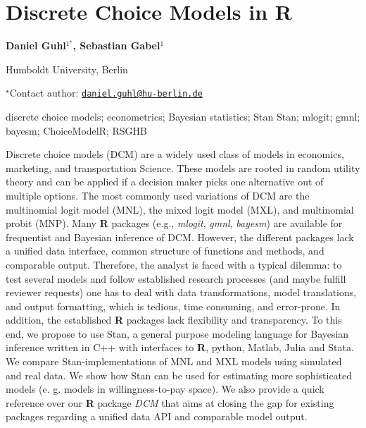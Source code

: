 \documentclass[\main/boa.tex]{subfiles}
\begin{document}
\section{Discrete Choice Models in R}

\begin{center}
  {\bf Daniel Guhl$^{1^\star}$, Sebastian Gabel$^{1}$}
\end{center}

\vskip 0.3cm

\begin{affiliations}
\begin{enumerate}
\begin{minipage}{0.915\textwidth}
\centering
\item Humboldt University, Berlin \\[-2pt]
\end{minipage}
\end{enumerate}
$^\star$Contact author: \href{mailto:daniel.guhl@hu-berlin.de}{\nolinkurl{daniel.guhl@hu-berlin.de}}\\
\end{affiliations}

\vskip 0.5cm

\begin{minipage}{0.915\textwidth}
\keywords discrete choice models; econometrics; Bayesian statistics; Stan
\packages Stan; mlogit; gmnl; bayesm; ChoiceModelR; RSGHB
\end{minipage}

\vskip 0.8cm

Discrete choice models (DCM) are a widely used class of models in
economics, marketing, and transportation Science. These models are
rooted in random utility theory and can be applied if a decision maker
picks one alternative out of multiple options. The most commonly used
variations of DCM are the multinomial logit model (MNL), the mixed logit
model (MXL), and multinomial probit (MNP). Many \textbf{R} packages
(e.g., \emph{mlogit}, \emph{gmnl}, \emph{bayesm}) are available for
frequentist and Bayesian inference of DCM. However, the different
packages lack a unified data interface, common structure of functions
and methods, and comparable output. Therefore, the analyst is faced with
a typical dilemma: to test several models and follow established
research processes (and maybe fulfill reviewer requests) one has to deal
with data transformations, model translations, and output formatting,
which is tedious, time consuming, and error-prone. In addition, the
established \textbf{R} packages lack flexibility and transparency. To
this end, we propose to use Stan, a general purpose modeling language
for Bayesian inference written in C++ with interfaces to \textbf{R},
python, Matlab, Julia and Stata. We compare Stan-implementations of MNL
and MXL models using simulated and real data. We show how Stan can be
used for estimating more sophisticated models (e. g. models in
willingness-to-pay space). We also provide a quick reference over our
\textbf{R} package \emph{DCM} that aims at closing the gap for existing
packages regarding a unified data API and comparable model output.
\end{document}
